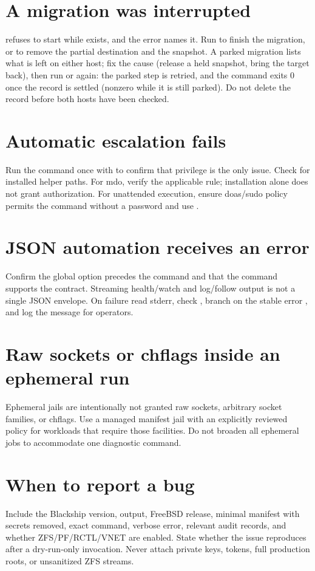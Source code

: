 \section{A migration was interrupted}

 refuses to start while 
exists, and the error names it. Run  to finish
the migration, or  to remove the partial
destination and the snapshot. A parked migration lists what is left on either
host; fix the cause (release a held snapshot, bring the target back), then run
 or  again: the parked step is retried, and the command exits 0 once the record is settled (nonzero while it is still parked). Do not delete the record
before both hosts have been checked.

\section{Automatic escalation fails}

Run the command once with  to confirm that privilege is
the only issue. Check  for installed helper paths. For
mdo, verify the applicable  rule; installation alone does not
grant authorization. For unattended execution, ensure doas/sudo policy permits
the command without a password and use .

\section{JSON automation receives an error}

Confirm the global option precedes the command and that the command supports the
contract. Streaming health/watch and log/follow output is not a single JSON
envelope. On failure read stderr, check , branch on the
stable error , and log the message for operators.

\section{Raw sockets or chflags inside an ephemeral run}

Ephemeral  jails are intentionally not granted raw sockets,
arbitrary socket families, or chflags. Use a managed manifest jail with an
explicitly reviewed policy for workloads that require those facilities. Do not
broaden all ephemeral jobs to accommodate one diagnostic command.

\section{When to report a bug}

Include the Blackship version,  output, FreeBSD release,
minimal manifest with secrets removed, exact command, verbose error, relevant
audit records, and whether ZFS/PF/RCTL/VNET are enabled. State whether the issue
reproduces after a dry-run-only invocation. Never attach private keys, tokens,
full production roots, or unsanitized ZFS streams.
